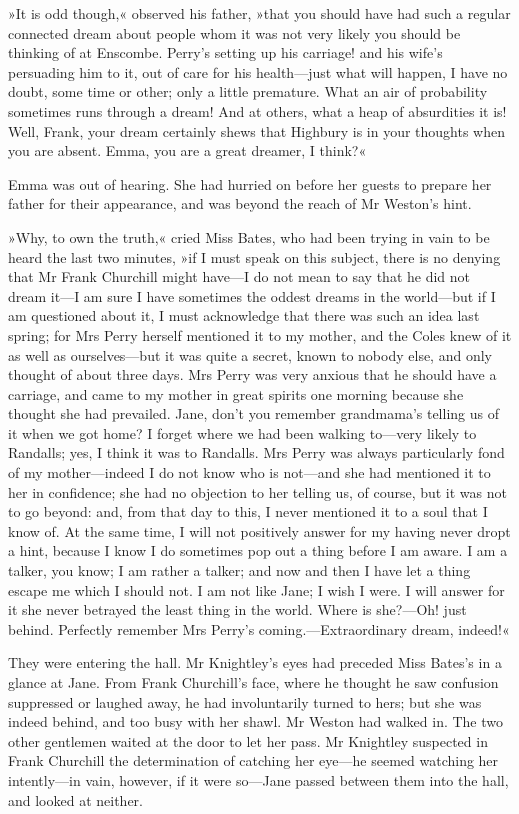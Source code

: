 »It is odd though,« observed his father, »that you should have had such a regular connected dream about people whom it was not very likely you should be thinking of at Enscombe. Perry's setting up his carriage! and his wife's persuading him to it, out of care for his health—just what will happen, I have no doubt, some time or other; only a little premature. What an air of probability sometimes runs through a dream! And at others, what a heap of absurdities it is! Well, Frank, your dream certainly shews that Highbury is in your thoughts when you are absent. Emma, you are a great dreamer, I think?«

Emma was out of hearing. She had hurried on before her guests to prepare her father for their appearance, and was beyond the reach of Mr Weston's hint.

»Why, to own the truth,« cried Miss Bates, who had been trying in vain to be heard the last two minutes, »if I must speak on this subject, there is no denying that Mr Frank Churchill might have—I do not mean to say that he did not dream it—I am sure I have sometimes the oddest dreams in the world—but if I am questioned about it, I must acknowledge that there was such an idea last spring; for Mrs Perry herself mentioned it to my mother, and the Coles knew of it as well as ourselves—but it was quite a secret, known to nobody else, and only thought of about three days. Mrs Perry was very anxious that he should have a carriage, and came to my mother in great spirits one morning because she thought she had prevailed. Jane, don't you remember grandmama's telling us of it when we got home? I forget where we had been walking to—very likely to Randalls; yes, I think it was to Randalls. Mrs Perry was always particularly fond of my mother—indeed I do not know who is not—and she had mentioned it to her in confidence; she had no objection to her telling us, of course, but it was not to go beyond: and, from that day to this, I never mentioned it to a soul that I know of. At the same time, I will not positively answer for my having never dropt a hint, because I know I do sometimes pop out a thing before I am aware. I am a talker, you know; I am rather a talker; and now and then I have let a thing escape me which I should not. I am not like Jane; I wish I were. I will answer for it she never betrayed the least thing in the world. Where is she?—Oh! just behind. Perfectly remember Mrs Perry's coming.—Extraordinary dream, indeed!«

They were entering the hall. Mr Knightley's eyes had preceded Miss Bates's in a glance at Jane. From Frank Churchill's face, where he thought he saw confusion suppressed or laughed away, he had involuntarily turned to hers; but she was indeed behind, and too busy with her shawl. Mr Weston had walked in. The two other gentlemen waited at the door to let her pass. Mr Knightley suspected in Frank Churchill the determination of catching her eye—he seemed watching her intently—in vain, however, if it were so—Jane passed between them into the hall, and looked at neither.

